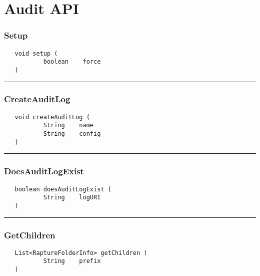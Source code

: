 \chapter{Audit API}

\subsection{Setup}
\label{Api:Setup}
\begin{verbatim}
   void setup (
           boolean    force
   )
\end{verbatim}



\rule{15cm}{2pt}
\subsection{CreateAuditLog}
\label{Api:CreateAuditLog}
\begin{verbatim}
   void createAuditLog (
           String    name
           String    config
   )
\end{verbatim}



\rule{15cm}{2pt}
\subsection{DoesAuditLogExist}
\label{Api:DoesAuditLogExist}
\begin{verbatim}
   boolean doesAuditLogExist (
           String    logURI
   )
\end{verbatim}



\rule{15cm}{2pt}
\subsection{GetChildren}
\label{Api:GetChildren}
\begin{verbatim}
   List<RaptureFolderInfo> getChildren (
           String    prefix
   )
\end{verbatim}



